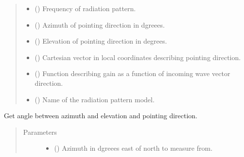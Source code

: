 \documentclass[letterpaper,10pt,english]{sphinxmanual}
\begin{document}
\begin{fulllineitems}
\begin{quote}
\begin{description}
\begin{itemize}
\item {} 
 () \textendash{} Frequency of radiation pattern.

\item {} 
 () \textendash{} Azimuth of pointing direction in dgreees.

\item {} 
 () \textendash{} Elevation of pointing direction in degrees.

\item {} 
 () \textendash{} Cartesian vector in local coordinates describing pointing direction.

\item {} 
 () \textendash{} Function describing gain as a function of incoming wave vector direction.

\item {} 
 () \textendash{} Name of the radiation pattern model.

\end{itemize}

\end{description}\end{quote}

\begin{fulllineitems}
\label{\detokenize{modules/antenna:antenna.BeamPattern.angle}}
Get angle between azimuth and elevation and pointing direction.
\begin{quote}\begin{description}
\item[{Parameters}] \leavevmode\begin{itemize}
\item {} 
 () \textendash{} Azimuth in dgreees east of north to measure from.


\end{itemize}
\end{description}
\end{quote}
\end{fulllineitems}
\end{fulllineitems}
\end{document}
